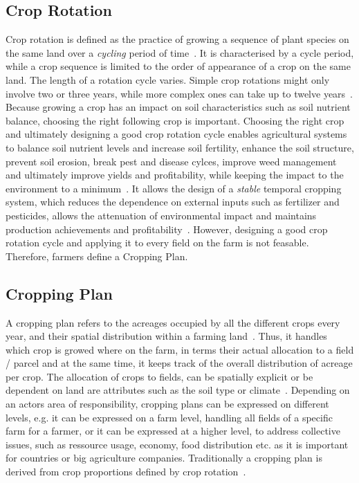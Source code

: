 \documentclass{Academic}
\begin{document}
    \subsection{Crop Rotation}
    Crop rotation is defined as the practice of growing a sequence of plant species on the same land over a \textit{cycling} period of time~\cite{noauthor_crop_2023, dury_models_2012}. It is characterised by a cycle period, while a crop sequence is limited to the order of appearance of a crop on the same land. The length of a rotation cycle varies. Simple crop rotations might only involve two or three years, while more complex ones can take up to twelve years~\cite{noauthor_crop_2023}. Because growing a crop has an impact on soil characteristics such as soil nutrient balance, choosing the right following crop is important. Choosing the right crop and ultimately designing a good crop rotation cycle enables agricultural systems to balance soil nutrient levels and increase soil fertility, enhance the soil structure, prevent soil erosion, break pest and disease cylces, improve weed management and ultimately improve yields and profitability, while keeping the impact to the environment to a minimum~\cite{noauthor_crop_2023}. It allows the design of a \textit{stable} temporal cropping system, which reduces the dependence on external inputs such as fertilizer and pesticides, allows the attenuation of environmental impact and maintains production achievements and profitability~\cite{dury_models_2012}. However, designing a good crop rotation cycle and applying it to every field on the farm is not feasable. Therefore, farmers define a Cropping Plan.

    \subsection{Cropping Plan}
    A cropping plan refers to the acreages occupied by all the different crops every year, and their spatial distribution within a farming land~\cite{dury_models_2012}. Thus, it handles which crop is growed where on the farm, in terms their actual allocation to a field / parcel and at the same time, it keeps track of the overall distribution of acreage per crop. The allocation of crops to fields, can be spatially explicit or be dependent on land are attributes such as the soil type or climate~\cite{dury_models_2012}. Depending on an actors area of responsibility, cropping plans can be expressed on different levels, e.g. it can be expressed on a farm level, handling all fields of a specific farm for a farmer, or it can be expressed at a higher level, to address collective issues, such as ressource usage, economy, food distribution etc. as it is important for countries or big agriculture companies. Traditionally a cropping plan is derived from crop proportions defined by crop rotation~\cite{dury_models_2012}.
\end{document}
